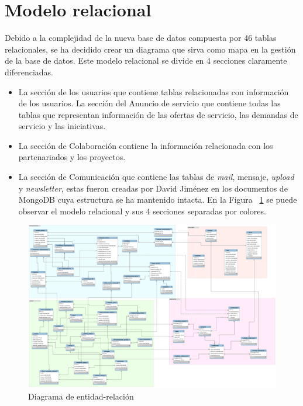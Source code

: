 \documentclass[11pt]{book}
\begin{document}
\section{Modelo relacional}

 Debido a la complejidad de la nueva base de datos compuesta por 46 tablas relacionales, se ha decidido crear un diagrama que sirva como mapa en la gestión de la base de datos. Este modelo relacional se divide en 4 secciones claramente diferenciadas.
 \begin{itemize} 
 	\item La sección de los usuarios que contiene tablas relacionadas con información de los usuarios. La sección del Anuncio de servicio que contiene todas las tablas que representan información de las ofertas de servicio, las demandas de servicio y las iniciativas.
	\item La sección de Colaboración contiene la información relacionada con los partenariados y los proyectos.
	\item La sección de Comunicación que contiene las tablas de \textit{mail}, mensaje, \textit{upload} y \textit{newsletter}, estas fueron creadas por David Jiménez en los documentos de MongoDB cuya estructura se ha mantenido intacta.
	En la Figura ~\ref{fig:relacional} se puede observar el modelo relacional y sus 4 secciones separadas por colores.
\end{itemize}
\begin{figure}[t]
	\centering
	\includegraphics[scale=0.15]{er}
	\caption{Diagrama de entidad-relación}
	\label{fig:relacional}
\end{figure}
\end{document}
